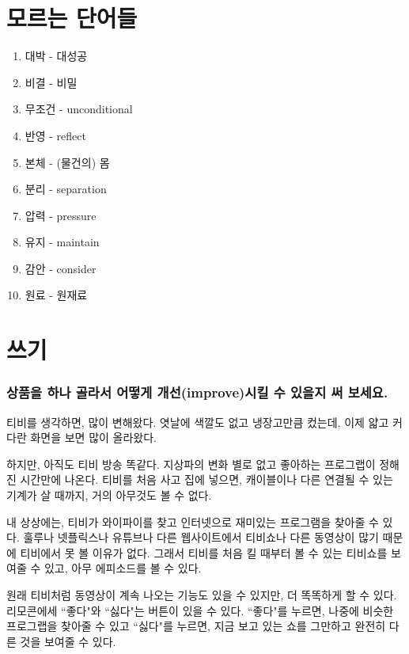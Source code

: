\documentclass[11pt]{article}
\begin{document}
\section{모르는 단어들}
\begin{enumerate}
  \item 대박 - 대성공
  \item 비결 - 비밀
  \item 무조건 - unconditional
  \item 반영 - reflect
  \item 본체 - (물건의) 몸
  \item 분리 - separation
  \item 압력 - pressure
  \item 유지 - maintain
  \item 감안 - consider
  \item 원료 - 원재료
\end{enumerate}
\section{쓰기}
\doublespacing
\subsubsection*{상품을 하나 골라서 어떻게 개선(improve)시킬 수 있을지 써 보세요.}

티비를 생각하면, 많이 변해왔다. 엿날에 색깔도 없고 냉장고만큼 컸는데, 이제 얇고 커다란 화면을 보면 많이 올라왔다.

하지만, 아직도 티비 방송 똑같다. 지상파의 변화 별로 없고 좋아하는 프로그랩이 정해진 시간만에 나온다. 티비를 처음 사고 집에 넣으면, 캐이블이나 다른 연결될 수 있는 기계가 살 때까지, 거의 아무것도 볼 수 없다.

내 상상에는, 티비가 와이파이를 찾고 인터넷으로 재미있는 프로그램을 찾아줄 수 있다. 훌루나 넷플릭스나 유튜브나 다른 웹사이트에서 티비쇼나 다른 동영상이 많기 때문에 티비에서 못 볼 이유가 없다.  그래서 티비를 처음 킬 때부터 볼 수 있는 티비쇼를 보여줄 수 있고, 아무 에피소드를 볼 수 있다.

원래 티비처럼 동영상이 계속 나오는 기능도 있을 수 있지만, 더 똑똑하게 할 수 있다.  리모콘에세 ``좋다"와 ``싫다"는 버튼이 있을 수 있다.  ``좋다"를 누르면, 나중에 비슷한 프로그랩을 찾아줄 수 있고 ``싫다"를 누르면, 지금 보고 있는 쇼를 그만하고 완전히 다른 것을 보여줄 수 있다.
\end{document}
